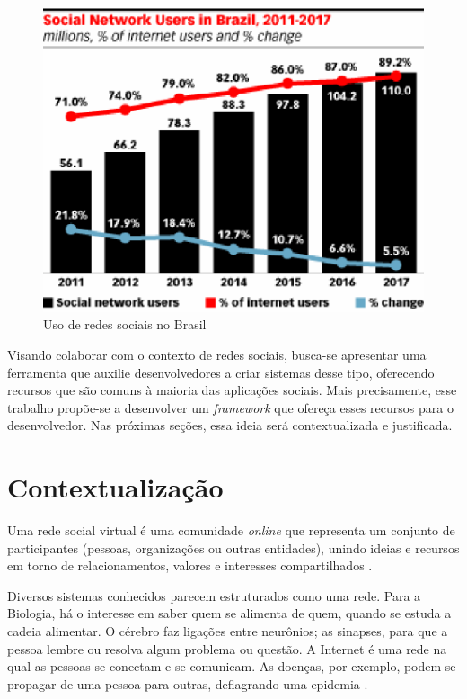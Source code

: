 \begin{figure}[!h]
	\centering
	\includegraphics[scale=0.8]{figuras/capitulo1/social_network_brazil.eps}
	\caption[Uso de redes sociais no Brasil]{Uso de redes sociais no Brasil \cite{eMarketer:2013}}
	\label{social_network_brazil}
\end{figure}

Visando colaborar com o contexto de redes sociais, busca-se apresentar uma ferramenta que auxilie desenvolvedores a criar sistemas desse tipo, oferecendo recursos que são comuns à maioria das aplicações sociais. Mais precisamente, esse trabalho propõe-se a desenvolver um \textit{framework} que ofereça esses recursos para o desenvolvedor. Nas próximas seções, essa ideia será contextualizada e justificada.

\section{Contextualização}

Uma rede social virtual é uma comunidade \textit{online} que representa um conjunto de participantes (pessoas, organizações ou outras entidades), unindo ideias e recursos em torno de relacionamentos, valores e interesses compartilhados \cite{Marteleto:2001}.

Diversos sistemas conhecidos parecem estruturados como uma rede. Para a Biologia, há o interesse em saber quem se alimenta de quem, quando se estuda a cadeia alimentar. O cérebro faz ligações entre neurônios; as sinapses, para que a pessoa lembre ou resolva algum problema ou questão. A Internet é uma rede na qual as pessoas se conectam e se comunicam. As doenças, por exemplo, podem se propagar de uma pessoa para outras, deflagrando uma epidemia \cite{Goular:2014}.

